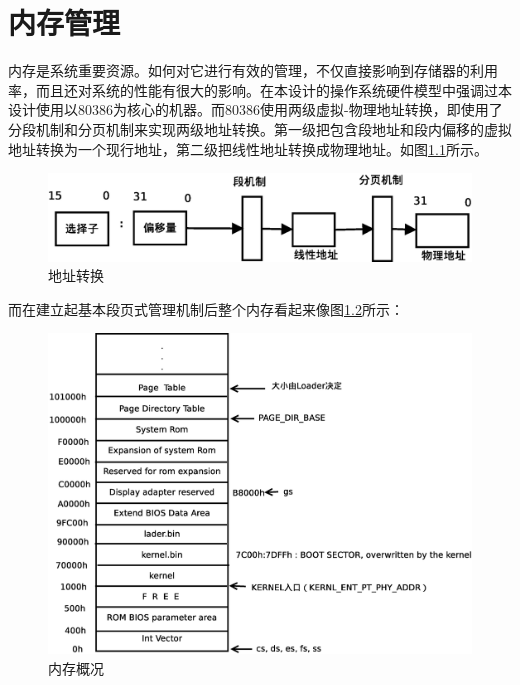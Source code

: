 \documentclass[UTF8,nofonts,cs4size]{ctexrep}
\begin{document}
\chapter{内存管理}
内存是系统重要资源。如何对它进行有效的管理，不仅直接影响到存储器的利用率，而且还对系统的性能有很大的影响。在本设计的操作系统硬件模型中强调过本设计使用以80386为核心的机器。而80386使用两级虚拟-物理地址转换，即使用了分段机制和分页机制来实现两级地址转换。第一级把包含段地址和段内偏移的虚拟地址转换为一个现行地址，第二级把线性地址转换成物理地址。如图\ref{machine}所示。
\begin{figure}[htp]
\centering
\includegraphics[scale=0.36]{machine.eps}
\caption{地址转换}
\label{machine}
\end{figure}

而在建立起基本段页式管理机制后整个内存看起来像图\ref{neicun}所示：
\begin{figure}[htp]
\centering
\includegraphics[scale=0.36]{neicun.eps}
\caption{内存概况}
\label{neicun}
\end{figure}
\end{document}
